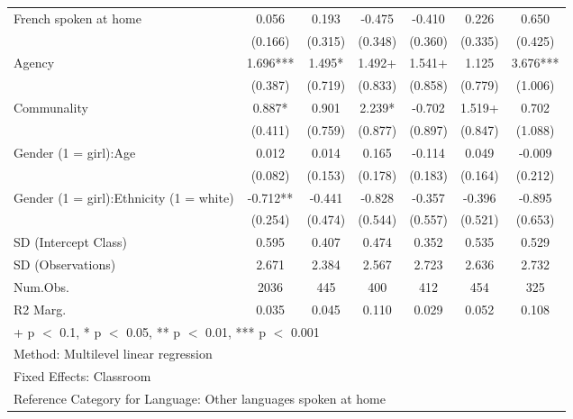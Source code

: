\documentclass[
  letterpaper,
  DIV=11,
  numbers=noendperiod]{scrreprt}
\begin{document}
\begin{table}
\begin{tabular}[t]{lcccccc}
French spoken at home & 0.056 & 0.193 & -0.475 & -0.410 & 0.226 & 0.650\\
\hspace{1em} & (0.166) & (0.315) & (0.348) & (0.360) & (0.335) & (0.425)\\
Agency & 1.696*** & 1.495* & 1.492+ & 1.541+ & 1.125 & 3.676***\\
\hspace{1em} & (0.387) & (0.719) & (0.833) & (0.858) & (0.779) & (1.006)\\
Communality & 0.887* & 0.901 & 2.239* & -0.702 & 1.519+ & 0.702\\
\hspace{1em} & (0.411) & (0.759) & (0.877) & (0.897) & (0.847) & (1.088)\\
Gender (1 = girl):Age & 0.012 & 0.014 & 0.165 & -0.114 & 0.049 & -0.009\\
\hspace{1em} & (0.082) & (0.153) & (0.178) & (0.183) & (0.164) & (0.212)\\
Gender (1 = girl):Ethnicity (1 = white) & -0.712** & -0.441 & -0.828 & -0.357 & -0.396 & -0.895\\
\hspace{1em} & (0.254) & (0.474) & (0.544) & (0.557) & (0.521) & (0.653)\\
\hspace{1em}SD (Intercept Class) & 0.595 & 0.407 & 0.474 & 0.352 & 0.535 & 0.529\\
\hspace{1em}SD (Observations) & 2.671 & 2.384 & 2.567 & 2.723 & 2.636 & 2.732\\
\midrule
\hspace{1em}Num.Obs. & 2036 & 445 & 400 & 412 & 454 & 325\\
\hspace{1em}R2 Marg. & 0.035 & 0.045 & 0.110 & 0.029 & 0.052 & 0.108\\
\bottomrule
\multicolumn{7}{l}{\rule{0pt}{1em}+ p $<$ 0.1, * p $<$ 0.05, ** p $<$ 0.01, *** p $<$ 0.001}\\
\multicolumn{7}{l}{\rule{0pt}{1em}Method: Multilevel linear regression}\\
\multicolumn{7}{l}{\rule{0pt}{1em}Fixed Effects: Classroom}\\
\multicolumn{7}{l}{\rule{0pt}{1em}Reference Category for Language: Other languages spoken at home}\\
\end{tabular}
\end{table}
\end{document}
